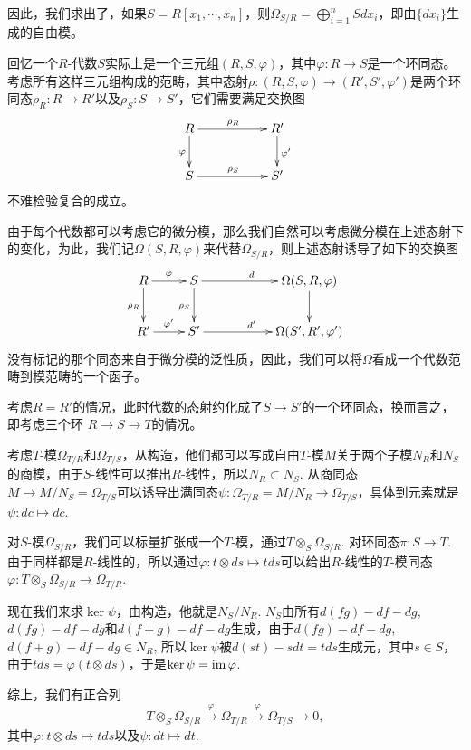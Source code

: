 因此，我们求出了，如果$S=R[x_1,\cdots,x_n]$，则$\Omega_{S/R}=\bigoplus_{i=1}^n Sdx_i$，即由$\{dx_i\}$生成的自由模。

\para 回忆一个$R$-代数$S$实际上是一个三元组$(R,S,\varphi)$，其中$\varphi:R\to S$是一个环同态。考虑所有这样三元组构成的范畴，其中态射$\rho:(R,S,\varphi)\to (R',S',\varphi')$是两个环同态$\rho_R:R\to R'$以及$\rho_S:S\to S'$，它们需要满足交换图
\[
\begin{xy}
	\xymatrix
	{
		R\ar[rr]^{\rho_R} \ar[d]_{\varphi}&&R' \ar[d]^{\varphi'}\\
		S\ar[rr]^{\rho_S}&&S'
	}
\end{xy}
\]
不难检验复合的成立。

由于每个代数都可以考虑它的微分模，那么我们自然可以考虑微分模在上述态射下的变化，为此，我们记$\Omega(S,R,\varphi)$来代替$\Omega_{S/R}$，则上述态射诱导了如下的交换图
\[
\begin{xy}
	\xymatrix
	{
		R\ar[r]^{\varphi}\ar[d]_{\rho_R}&S\ar[rr]^{d} \ar[d]_{\rho_S}&&\Omega(S,R,\varphi) \ar[d]\\
		R'\ar[r]^{\varphi'}&S'\ar[rr]^{d'}&&\Omega(S',R',\varphi')
	}
\end{xy}
\]
没有标记的那个同态来自于微分模的泛性质，因此，我们可以将$\Omega$看成一个代数范畴到模范畴的一个函子。

\para 考虑$R=R'$的情况，此时代数的态射约化成了$S\to S'$的一个环同态，换而言之，即考虑三个环
$R\to S\to T$的情况。

考虑$T$-模$\Omega_{T/R}$和$\Omega_{T/S}$，从构造，他们都可以写成自由$T$-模$M$关于两个子模$N_R$和$N_S$的商模，由于$S$-线性可以推出$R$-线性，所以$N_R\subset N_S$. 从商同态$M\to M/N_S=\Omega_{T/S}$可以诱导出满同态$\psi:\Omega_{T/R}=M/N_R\to \Omega_{T/S}$，具体到元素就是$\psi:dc\mapsto dc$. 

对$S$-模$\Omega_{S/R}$，我们可以标量扩张成一个$T$-模，通过$T\otimes_S \Omega_{S/R}$. 对环同态$\pi:S\to T$. 由于同样都是$R$-线性的，所以通过$\varphi:t\otimes ds\mapsto tds$可以给出$R$-线性的$T$-模同态$\varphi:T\otimes_S \Omega_{S/R}\to \Omega_{T/R}$.

现在我们来求$\ker\psi$，由构造，他就是$N_S/N_R$. $N_S$由所有$d(fg)-df-dg$, $d(fg)-df-dg$和$d(f+g)-df-dg$生成，由于$d(fg)-df-dg$, $d(f+g)-df-dg\in N_R$, 所以$\ker\psi$被$d(st)-sdt=tds$生成元，其中$s\in S$，由于$tds=\varphi(t\otimes ds)$，于是$\ker\psi=\operatorname{im}\varphi$.

综上，我们有正合列
\[
	T\otimes_S \Omega_{S/R}\xrightarrow{\varphi} \Omega_{T/R}\xrightarrow{\varphi} \Omega_{T/S}\to 0,
\]
其中$\varphi:t\otimes ds\mapsto tds$以及$\psi:dt\mapsto dt$.

